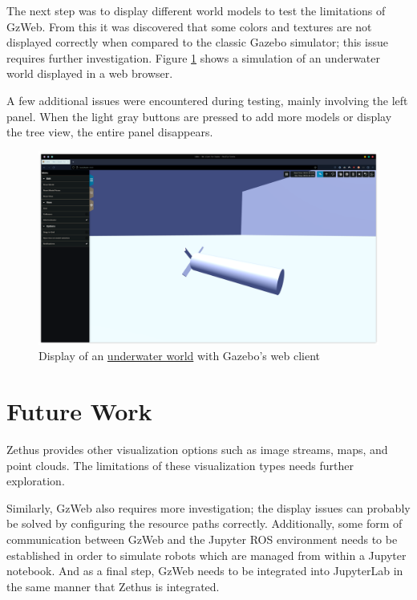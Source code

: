     The next step was to display different world models to test the limitations of GzWeb. From this it was discovered that some colors and textures are not displayed correctly when compared to the classic Gazebo simulator; this issue requires further investigation. Figure \ref{fig:underwater} shows a simulation of an underwater world displayed in a web browser.
    
    A few additional issues were encountered during testing, mainly involving the left panel. When the light gray buttons are pressed to add more models or display the tree view, the entire panel disappears. 

\begin{figure}[H]
    \centering
    \includegraphics[width=\linewidth]{Images/04_underwater.png}
    \caption{Display of an \href{https://github.com/osrf/gazebo/blob/gazebo11/worlds/underwater.world}{underwater world} with Gazebo's web client}
    \label{fig:underwater}
\end{figure}


\section{Future Work}

    Zethus provides other visualization options such as image streams, maps, and point clouds. The limitations of these visualization types needs further exploration.

    Similarly, GzWeb also requires more investigation; the display issues can probably be solved by configuring the resource paths correctly. Additionally, some form of communication between GzWeb and the Jupyter ROS environment needs to be established in order to simulate robots which are managed from within a Jupyter notebook. And as a final step, GzWeb needs to be integrated into JupyterLab in the same manner that Zethus is integrated.